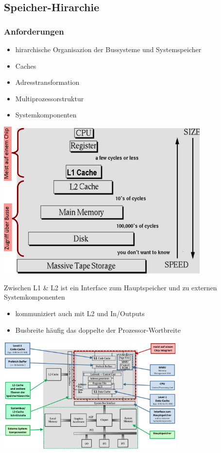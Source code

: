 \begin{minipage}{0.5\linewidth}
    \subsection{Speicher-Hirarchie}
\subsubsection{Anforderungen}
\begin{itemize}
    \item hirarchische Organisazion der Bussysteme und Systemspeicher
    \item Caches
    \item Adresstransformation
    \item Multiprozessorstruktur
    \item Systemkomponenten 
\end{itemize}
\end{minipage}
\begin{minipage}{0.5\linewidth}
    \includegraphics[width=0.8\textwidth]{images/SystembusSpeicherSpeichersystem/SpeicherSysHierarchie}
\end{minipage}\newline
Zwischen L1 \& L2 ist ein Interface zum Hauptspeicher und zu externen Systemkomponenten
\begin{itemize}
    \item kommuniziert auch mit L2 und In/Outputs
    \item Busbreite häufig das doppelte der Prozessor-Wortbreite
\end{itemize}
\begin{minipage}{\linewidth}
    \includegraphics[width=0.7\textwidth]{images/SystembusSpeicherSpeichersystem/SpeicherSysStrukt}\centering
\end{minipage}\newline

